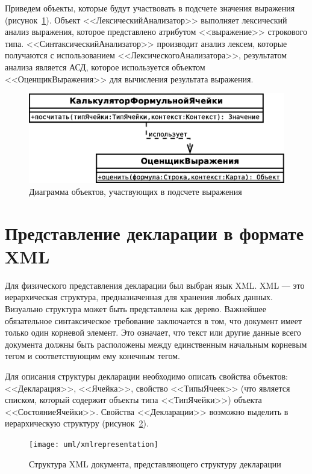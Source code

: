 \documentclass[14pt,a4paper]{reportmod}
\begin{document}
Приведем объекты, которые будут участвовать в подсчете значения выражения (рисунок~\ref{pic:classes_4}).
Объект <<ЛексическийАнализатор>> выполняет лексический анализ выражения, которое представлено атрибутом <<выражение>> строкового типа. <<СинтаксическийАнализатор>> производит анализ лексем, которые получаются с использованием <<ЛексическогоАнализатора>>, результатом анализа является АСД, которое используется объектом <<ОценщикВыражения>> для вычисления результата выражения.

\begin{figure}
  \centering
  \includegraphics[scale=0.5]{uml/_classes_4}
  \caption{Диаграмма объектов, участвующих в подсчете выражения}
  \label{pic:classes_4}
\end{figure}

\section{Представление декларации в формате XML}
Для физического представления декларации был выбран язык XML. XML — это иерархическая структура, предназначенная для хранения любых данных. Визуально структура может быть представлена как дерево. Важнейшее обязательное синтаксическое требование заключается в том, что документ имеет только один корневой элемент. Это означает, что текст или другие данные всего документа должны быть расположены между единственным начальным корневым тегом и соответствующим ему конечным тегом.

Для описания структуры декларации необходимо описать свойства объектов: <<Декларация>>, <<Ячейка>>, свойство <<ТипыЯчеек>> (что является списком, который содержит объекты типа <<ТипЯчейки>>) объекта <<СостояниеЯчейки>>. Свойства <<Декларации>> возможно выделить в иерархическую структуру (рисунок~\ref{pic:xmlrepresentation}).

\begin{figure}[ht]
  \centering
  \texttt{[image: uml/xmlrepresentation]}
  \caption{Структура XML документа, представляющего структуру декларации}
  \label{pic:xmlrepresentation}
\end{figure}
\end{document}
